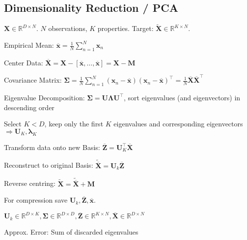 \documentclass[a4paper, 11pt, landscape]{article}
\begin{document}
\begin{multicols*}{3}
\section{Dimensionality Reduction / PCA}
$\mathbf{X} \in \mathbb{R}^{D \times N}$. $N$ observations, $K$ properties. Target: $\tilde{\mathbf{X}} \in \mathbb{R}^{K \times N}$.
\begin{compactenum}
	\item Empirical Mean: $\overline{\mathbf{x}} = \frac{1}{N} \sum_{n=1}^N \mathbf{x}_n$
	\item Center Data: $\overline{\mathbf{X}} = \mathbf{X} - [\overline{\mathbf{x}}, \ldots, \overline{\mathbf{x}}] = \mathbf{X} - \mathbf{M}$
	\item Covariance Matrix: $\boldsymbol{\Sigma} = \frac{1}{N	} \sum_{n=1}^N (\mathbf{x}_n - \overline{\mathbf{x}}) (\mathbf{x}_n - \overline{\mathbf{x}})^\top = \frac{1}{N} \overline{\mathbf{X}}\overline{\mathbf{X}}^\top$
	\item Eigenvalue Decomposition: $\boldsymbol{\Sigma} = \mathbf{U} \boldsymbol{\Lambda} \mathbf{U}^\top$, sort eigenvalues (and eigenvectors) in descending order
	\item Select $K < D$, keep only the first $K$ eigenvalues and corresponding eigenvectors $\Rightarrow \mathbf{U}_K, \boldsymbol{\lambda}_K$
	\item Transform data onto new Basis: $\overline{\mathbf{Z}} = \mathbf{U}_K^\top \overline{\mathbf{X}}$
	\item Reconstruct to original Basis: $\tilde{\overline{\mathbf{X}}} = \mathbf{U}_k \overline{\mathbf{Z}}$
	\item Reverse centring: $\tilde{\mathbf{X}} = \tilde{\overline{\mathbf{X}}} + \mathbf{M}$
\end{compactenum}

\begin{compactitem}
	\item For compression save $\mathbf{U}_k, \overline{\mathbf{Z}}, \overline{\mathbf{x}}$.
	\item $\mathbf{U}_k \in \mathbb{R}^{D \times K}, \boldsymbol{\Sigma} \in \mathbb{R}^{D \times D}, \overline{\mathbf{Z}} \in \mathbb{R}^{K \times N}, \overline{\mathbf{X}} \in \mathbb{R}^{D \times N}$
\end{compactitem}

\begin{compactdesc}
	\item[Approx. Error:] Sum of discarded eigenvalues
\end{compactdesc}


\end{multicols*}
\end{document}
